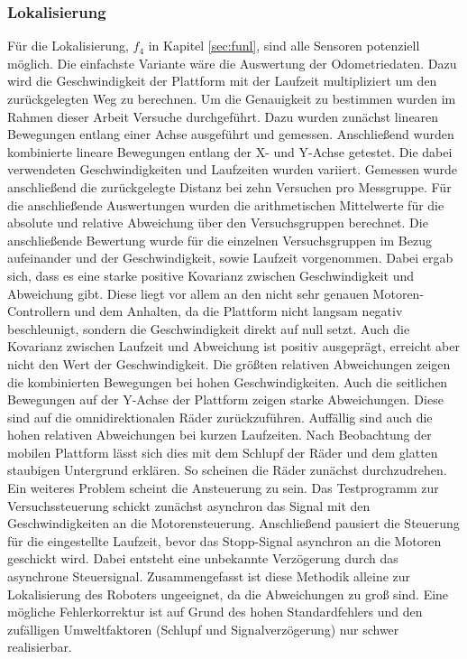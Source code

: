 \subsubsection{Lokalisierung}
\label{seq:lok}
Für die Lokalisierung, $f_4$ in Kapitel \ref{sec:funl}, sind alle Sensoren potenziell möglich. Die einfachste Variante wäre die Auswertung der Odometriedaten. Dazu wird die Geschwindigkeit der Plattform mit der Laufzeit multipliziert um den zurückgelegten Weg zu berechnen. Um die Genauigkeit zu bestimmen wurden im Rahmen dieser Arbeit Versuche durchgeführt. Dazu wurden zunächst linearen Bewegungen entlang einer Achse ausgeführt und gemessen. Anschließend wurden kombinierte lineare Bewegungen entlang der X- und Y-Achse getestet. Die dabei verwendeten Geschwindigkeiten und Laufzeiten wurden variiert. Gemessen wurde anschließend die zurückgelegte Distanz bei zehn Versuchen pro Messgruppe. Für die anschließende Auswertungen wurden die arithmetischen Mittelwerte für die absolute und relative Abweichung über den Versuchsgruppen berechnet. Die anschließende Bewertung wurde für die einzelnen Versuchsgruppen im Bezug aufeinander und der Geschwindigkeit, sowie Laufzeit vorgenommen. Dabei ergab sich, dass es eine starke positive Kovarianz zwischen Geschwindigkeit und Abweichung gibt. Diese liegt vor allem an den nicht sehr genauen Motoren-Controllern und dem Anhalten, da die Plattform nicht langsam negativ beschleunigt, sondern die Geschwindigkeit direkt auf null setzt. Auch die Kovarianz zwischen Laufzeit und Abweichung ist positiv ausgeprägt, erreicht aber nicht den Wert der Geschwindigkeit. Die größten relativen Abweichungen zeigen die kombinierten Bewegungen bei hohen Geschwindigkeiten. Auch die seitlichen Bewegungen auf der Y-Achse der Plattform zeigen starke Abweichungen. Diese sind auf die omnidirektionalen Räder zurückzuführen. Auffällig sind auch die hohen relativen Abweichungen bei kurzen Laufzeiten. Nach Beobachtung der mobilen Plattform lässt sich dies mit dem Schlupf der Räder und dem glatten staubigen Untergrund erklären. So scheinen die Räder zunächst durchzudrehen. Ein weiteres Problem scheint die Ansteuerung zu sein. Das Testprogramm zur Versuchssteuerung schickt zunächst asynchron das Signal mit den Geschwindigkeiten an die Motorensteuerung. Anschließend pausiert die Steuerung für die eingestellte Laufzeit, bevor das Stopp-Signal asynchron an die Motoren geschickt wird. Dabei entsteht eine unbekannte Verzögerung durch das asynchrone Steuersignal. Zusammengefasst ist diese Methodik alleine zur Lokalisierung des Roboters ungeeignet, da die Abweichungen zu groß sind. Eine mögliche Fehlerkorrektur ist auf Grund des hohen Standardfehlers und den zufälligen Umweltfaktoren (Schlupf und Signalverzögerung) nur schwer realisierbar.

